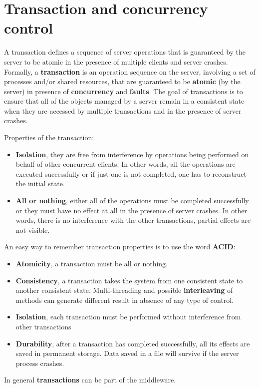 \section{Transaction and concurrency control}
A transaction defines a sequence of server operations that is guaranteed by the
server to be atomic in the presence of multiple clients and server crashes.
Formally, a \textbf{transaction} is an operation sequence on the server, involving a set of processes and/or shared resources, that are guaranteed to be \textbf{atomic} (by the server) in presence of \textbf{concurrency} and \textbf{faults}.
The goal of transactions is to ensure that all of the objects managed by a server remain in a consistent state when they are accessed by multiple transactions and in the presence of server crashes.

Properties of the transaction:
\begin{itemize}
	\item \textbf{Isolation}, they are free from interference by operations being performed on behalf of other concurrent clients. In other words, all the operations are executed successfully or if just one is not completed, one has to reconstruct the initial state.
	
	\item \textbf{All or nothing}, either all of the operations must be completed successfully or they must have no effect at all in the presence of server crashes. In other words, there is no interference with the other transactions, partial effects are not visible.
\end{itemize}

An easy way to remember transaction properties is to use the word \textbf{ACID}:
\begin{itemize}
	\item \textbf{Atomicity}, a transaction must be all or nothing.
	\item \textbf{Consistency}, a transaction takes the system from one consistent state to another consistent state. Multi-threading and possible \textbf{interleaving} of methods can generate different result in absence of any type of control.
	\item \textbf{Isolation}, each transaction must be performed without interference from other transactions
	\item \textbf{Durability}, after a transaction has completed successfully, all its effects are saved in permanent storage. Data saved in a file will survive if the server process crashes.
\end{itemize}
In general \textbf{transactions} can be part of the middleware.

